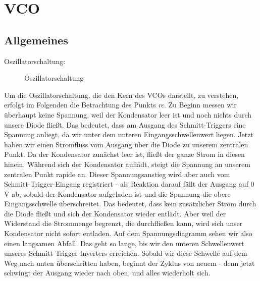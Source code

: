 \chapter{VCO}
\label{ch:VCO}
\section{Allgemeines}

Oszillatorschaltung:

\begin{figure}[h]
	\centering
	\setlength{\fboxsep}{1pt} %
	\setlength{\fboxrule}{1pt} %
	\caption{Oszillatorschaltung}
	\label{fig:fig:Oszillatorschaltung}
\end{figure}

Um die Oszillatorschaltung, die den Kern des VCOs darstellt, zu verstehen, erfolgt im Folgenden die Betrachtung des Punkts \textit{rc}.
Zu Beginn messen wir überhaupt keine Spannung, weil der Kondensator leer ist und noch nichts durch unsere Diode fließt. 
Das bedeutet, dass am Ausgang des Schmitt-Triggers eine Spannung anliegt, da wir unter dem unteren Eingangsschwellenwert liegen. 
Jetzt haben wir einen Stromfluss vom Ausgang über die Diode zu unserem zentralen Punkt. 
Da der Kondensator zunächst leer ist, fließt der ganze Strom in diesen hinein.
Während sich der Kondensator auflädt, steigt die Spannung an unserem zentralen Punkt rapide an.
Dieser Spannungsanstieg wird aber auch vom Schmitt-Trigger-Eingang registriert - als Reaktion darauf fällt der Ausgang auf 0 V ab, sobald der Kondensator aufgeladen ist und die Spannung die obere Eingangsschwelle überschreitet.
Das bedeutet, dass kein zusätzlicher Strom durch die Diode fließt und sich der Kondensator wieder entlädt. 
Aber weil der Widerstand die Strommenge begrenzt, die durchfließen kann, wird sich unser Kondensator nicht sofort entladen. 
Auf dem Spannungsdiagramm sehen wir also einen langsamen Abfall. 
Das geht so lange, bis wir den unteren Schwellenwert unseres Schmitt-Trigger-Inverters erreichen. 
Sobald wir diese Schwelle auf dem Weg nach unten überschritten haben, beginnt der Zyklus von neuem - denn jetzt schwingt der Ausgang wieder nach oben, und alles wiederholt sich.


